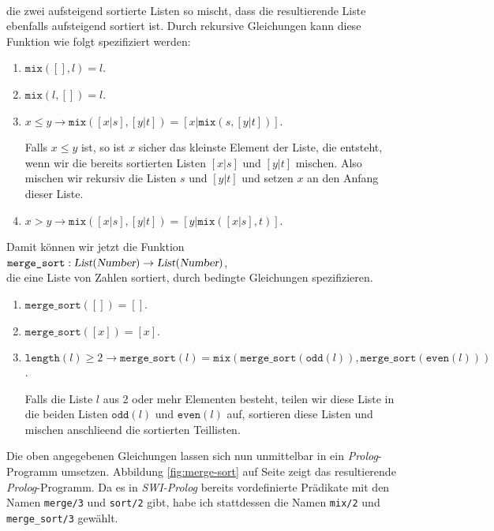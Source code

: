 \\[0.2cm]
die zwei aufsteigend sortierte Listen so mischt,  dass die resultierende Liste ebenfalls
aufsteigend sortiert ist.  Durch rekursive Gleichungen kann diese Funktion wie folgt
spezifiziert werden: 
\begin{enumerate}
\item $\texttt{mix}([], l) = l$.
\item $\texttt{mix}(l, []) = l$.
\item $x \leq y \rightarrow \texttt{mix}([x|s], [y|t]) = [x|\texttt{mix}(s, [y|t])]$.

      Falls $x \leq y$ ist, so ist $x$ sicher das kleinste Element
      der Liste, die entsteht, wenn wir die bereits sortierten Listen $[x|s]$ und $[y|t]$ mischen.
      Also mischen wir rekursiv die Listen $s$ und $[y|t]$ und setzen $x$ an den Anfang
      dieser Liste.
\item $x  >   y \rightarrow \texttt{mix}([x|s], [y|t]) = [y|\texttt{mix}([x|s], t)]$.
\end{enumerate}
Damit k\"{o}nnen wir jetzt die Funktion\\[0.2cm]
\hspace*{1.3cm}  $\texttt{merge\_sort}: \textsl{List}(\textsl{Number}) \rightarrow \textsl{List}(\textsl{Number})$,
\\[0.2cm]
die eine Liste von Zahlen sortiert, durch bedingte Gleichungen spezifizieren.
\begin{enumerate}
\item $\texttt{merge\_sort}([]) = []$.
\item $\texttt{merge\_sort}([x]) = [x]$.
\item $\mathtt{length}(l) \geq 2 \rightarrow \texttt{merge\_sort}(l) = \texttt{mix}(
  \texttt{merge\_sort}(\texttt{odd}(l)),
  \texttt{merge\_sort}(\texttt{even}(l)))$.

      Falls die Liste $l$ aus 2 oder mehr Elementen besteht, teilen wir diese Liste
      in die beiden Listen $\mathtt{odd}(l)$ und $\mathtt{even}(l)$ auf, sortieren 
      diese Listen und mischen anschlie\3end die sortierten Teillisten.
\end{enumerate}
Die oben angegebenen Gleichungen lassen sich nun unmittelbar in ein
\textsl{Prolog}-Programm umsetzen.  Abbildung \ref{fig:merge-sort}
auf Seite \pageref{fig:merge-sort} zeigt das resultierende \textsl{Prolog}-Programm.
Da es in \textsl{SWI-Prolog} bereits vordefinierte Pr\"{a}dikate mit den Namen 
\texttt{merge/3} und \texttt{sort/2} gibt, habe ich stattdessen die Namen
\texttt{mix/2} und \texttt{merge\_sort/3} gew\"{a}hlt.


